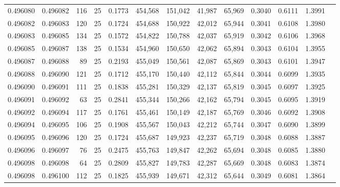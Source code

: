 \begin{tabular}{rrrrrrrrrrrrr}
0.496080 & 0.496082 &   116 &  25 &                                     0.1773 & 454,568 & 151,042 &  41,987 &  65,969 & 0.3040 & 0.6111 & 1.3991 \\
0.496082 & 0.496083 &   120 &  25 &                                     0.1724 & 454,688 & 150,922 &  42,012 &  65,944 & 0.3041 & 0.6108 & 1.3980 \\
0.496083 & 0.496085 &   134 &  25 &                                     0.1572 & 454,822 & 150,788 &  42,037 &  65,919 & 0.3042 & 0.6106 & 1.3968 \\
0.496085 & 0.496087 &   138 &  25 &                                     0.1534 & 454,960 & 150,650 &  42,062 &  65,894 & 0.3043 & 0.6104 & 1.3955 \\
0.496087 & 0.496088 &    89 &  25 &                                     0.2193 & 455,049 & 150,561 &  42,087 &  65,869 & 0.3043 & 0.6101 & 1.3947 \\
0.496088 & 0.496090 &   121 &  25 &                                     0.1712 & 455,170 & 150,440 &  42,112 &  65,844 & 0.3044 & 0.6099 & 1.3935 \\
0.496090 & 0.496091 &   111 &  25 &                                     0.1838 & 455,281 & 150,329 &  42,137 &  65,819 & 0.3045 & 0.6097 & 1.3925 \\
0.496091 & 0.496092 &    63 &  25 &                                     0.2841 & 455,344 & 150,266 &  42,162 &  65,794 & 0.3045 & 0.6095 & 1.3919 \\
0.496092 & 0.496094 &   117 &  25 &                                     0.1761 & 455,461 & 150,149 &  42,187 &  65,769 & 0.3046 & 0.6092 & 1.3908 \\
0.496094 & 0.496095 &   106 &  25 &                                     0.1908 & 455,567 & 150,043 &  42,212 &  65,744 & 0.3047 & 0.6090 & 1.3899 \\
0.496095 & 0.496096 &   120 &  25 &                                     0.1724 & 455,687 & 149,923 &  42,237 &  65,719 & 0.3048 & 0.6088 & 1.3887 \\
0.496096 & 0.496097 &    76 &  25 &                                     0.2475 & 455,763 & 149,847 &  42,262 &  65,694 & 0.3048 & 0.6085 & 1.3880 \\
0.496098 & 0.496098 &    64 &  25 &                                     0.2809 & 455,827 & 149,783 &  42,287 &  65,669 & 0.3048 & 0.6083 & 1.3874 \\
0.496098 & 0.496100 &   112 &  25 &                                     0.1825 & 455,939 & 149,671 &  42,312 &  65,644 & 0.3049 & 0.6081 & 1.3864 \\

\end{tabular}
